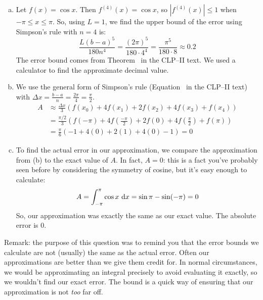 \begin{solution}
\begin{enumerate}[(a)]
\item Let $f(x) = \cos x$. Then $f^{(4)}(x)=\cos x$, so $|f^{(4)}(x)| \leq 1$ when $-\pi \leq x \leq \pi$. So, using $L=1$, we find the upper bound of the error using Simpson's rule with $n=4$ is:
\[\frac{L(b-a)^5}{180 n^4} = \frac{(2\pi)^5}{180\cdot 4^4} = \frac{\pi^5}{180\cdot8}\approx 0.2\]
The error bound comes from Theorem~ in the CLP--II text.
We used a calculator to find the approximate decimal value.
\item
We use the general form of Simpson's rule (Equation~ in
the CLP--II text) with $\Delta x = \frac{b-a}{n}=\frac{2\pi}{4} = \frac{\pi}{2}$.
\begin{align*}
A& \approx \frac{\Delta x}{3}\left(f(x_0) + 4f(x_1)+2f(x_2)+4f(x_3)+f(x_4)\right)
\\&=\frac{\pi/2}{3}\left(f(-\pi) + 4f(\tfrac{-\pi}{2})+2f(0)+4f(\tfrac{\pi}{2})+f(\pi)\right)\\
&= \frac{\pi}{6}\left(-1 + 4(0)+2(1)+4(0)-1\right)=0
\end{align*}
\item
To find the actual error in our approximation, we compare the approximation from (b) to the exact value of $A$. In fact, $A=0$: this is a fact you've probably seen before by considering the symmetry of cosine, but it's easy enough to calculate:
\[A = \int_{-\pi}^{\pi} \cos x~\mathrm{d}x= \sin \pi - \sin (-\pi) = 0\]
So, our approximation was exactly the same as our exact value. The absolute error is 0.
\end{enumerate}
Remark: the purpose of this question was to remind you that the error bounds we calculate are not (usually) the same as the actual error. Often our approximations are better than we give them credit for. In normal circumstances, we would be approximating an integral precisely to avoid evaluating it exactly, so we wouldn't find our exact error. The bound is a quick way of ensuring that our approximation is not \emph{too} far off.
\end{solution}

